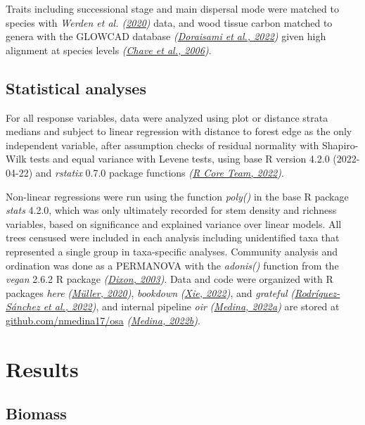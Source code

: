 \documentclass[
  12pt,
]{article}
\begin{document}
Traits including successional stage and main dispersal mode were matched to species with \emph{Werden et al. (\protect\hyperlink{ref-werden20}{2020})} data, and wood tissue carbon matched to genera with the GLOWCAD database \emph{(\protect\hyperlink{ref-doraisami22}{Doraisami et al., 2022})} given high alignment at species levels \emph{(\protect\hyperlink{ref-chave06}{Chave et al., 2006})}.

\hypertarget{statistical-analyses}{%
\subsection{Statistical analyses}\label{statistical-analyses}}

For all response variables, data were analyzed using plot or distance strata medians and subject to linear regression with distance to forest edge as the only independent variable, after assumption checks of residual normality with Shapiro-Wilk tests and equal variance with Levene tests, using base R version 4.2.0 (2022-04-22) and \emph{rstatix} 0.7.0 package functions \emph{(\protect\hyperlink{ref-base}{R Core Team, 2022})}.

Non-linear regressions were run using the function \emph{poly()} in the base R package \emph{stats} 4.2.0,
which was only ultimately recorded for stem density and richness variables, based on significance and explained variance over linear models.
All trees censused were included in each analysis including unidentified taxa that represented a single group in taxa-specific analyses.
Community analysis and ordination was done as a PERMANOVA with the \emph{adonis()} function from the \emph{vegan} 2.6.2 R package \emph{(\protect\hyperlink{ref-dixon03}{Dixon, 2003})}.
Data and code were organized with R packages \emph{here} \emph{(\protect\hyperlink{ref-here}{Müller, 2020})}, \emph{bookdown} \emph{(\protect\hyperlink{ref-bookdown2022}{Xie, 2022})}, and \emph{grateful} \emph{(\protect\hyperlink{ref-grateful}{Rodríguez-Sánchez et al., 2022})}, and internal pipeline \emph{oir} \emph{(\protect\hyperlink{ref-softwareMedina22oir}{Medina, 2022a})} are stored at \url{github.com/nmedina17/osa} \emph{(\protect\hyperlink{ref-softwareMedina22osa}{Medina, 2022b})}.

\hypertarget{results}{%
\section{Results}\label{results}}

\hypertarget{biomass}{%
\subsection{Biomass}\label{biomass}}
\end{document}
